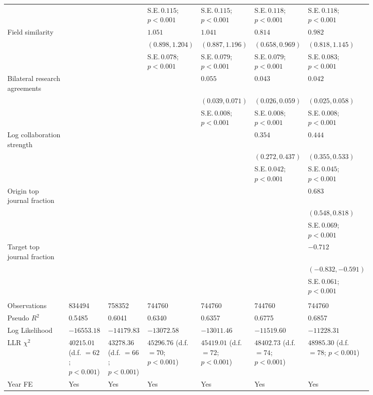 \begin{table}[H]
{\begin{tabular}{p{0.2\linewidth}p{0.11\linewidth}p{0.11\linewidth}p{0.11\linewidth}p{0.11\linewidth}p{0.11\linewidth}p{0.11\linewidth}}
 &  &  & S.E.\,$0.115$; ${p < 0.001}$ & S.E.\,$0.115$; ${p < 0.001}$ & S.E.\,$0.118$; ${p < 0.001}$ & S.E.\,$0.118$; ${p < 0.001}$\\ [0.8ex]  
Field similarity &  &  & $1.051$ & $1.041$ & $0.814$ & $0.982$\\ 
 &  &  & $(0.898, 1.204)$ & $(0.887, 1.196)$ & $(0.658, 0.969)$ & $(0.818, 1.145)$\\ 
 &  &  & S.E.\,$0.078$; ${p < 0.001}$ & S.E.\,$0.079$; ${p < 0.001}$ & S.E.\,$0.079$; ${p < 0.001}$ & S.E.\,$0.083$; ${p < 0.001}$\\ [0.8ex]  
Bilateral research agreements &  &  &  & $0.055$ & $0.043$ & $0.042$\\ 
 &  &  &  & $(0.039, 0.071)$ & $(0.026, 0.059)$ & $(0.025, 0.058)$\\ 
 &  &  &  & S.E.\,$0.008$; ${p < 0.001}$ & S.E.\,$0.008$; ${p < 0.001}$ & S.E.\,$0.008$; ${p < 0.001}$\\ [0.8ex]  
Log collaboration strength &  &  &  &  & $0.354$ & $0.444$\\ 
 &  &  &  &  & $(0.272, 0.437)$ & $(0.355, 0.533)$\\ 
 &  &  &  &  & S.E.\,$0.042$; ${p < 0.001}$ & S.E.\,$0.045$; ${p < 0.001}$\\ [0.8ex]  
Origin top journal fraction &  &  &  &  &  & $0.683$\\ 
 &  &  &  &  &  & $(0.548, 0.818)$\\ 
 &  &  &  &  &  & S.E.\,$0.069$; ${p < 0.001}$\\ [0.8ex]  
Target top journal fraction &  &  &  &  &  & $-0.712$\\ 
 &  &  &  &  &  & $(-0.832, -0.591)$\\ 
 &  &  &  &  &  & S.E.\,$0.061$; ${p < 0.001}$\\ [0.8ex]  
\hline 
\hline \\[-1.8ex] 
Observations & 834494 & 758352 & 744760 & 744760 & 744760 & 744760 \\ 
Pseudo $R^2$ & 0.5485 & 0.6041 & 0.6340 & 0.6357 & 0.6775 & 0.6857 \\ 
Log Likelihood & $-16553.18$ & $-14179.83$ & $-13072.58$ & $-13011.46$ & $-11519.60$ & $-11228.31$ \\ 
LLR $\chi^2$  & $40215.01$ (d.f. $= 62$; ${p < 0.001}$) & $43278.36$ (d.f. $= 66$; ${p < 0.001}$) & $45296.76$ (d.f. $= 70$; ${p < 0.001}$) & $45419.01$ (d.f. $= 72$; ${p < 0.001}$) & $48402.73$ (d.f. $= 74$; ${p < 0.001}$) & $48985.30$ (d.f. $= 78$; ${p < 0.001}$) \\ 
Year FE  & Yes & Yes & Yes & Yes & Yes & Yes \\ 
\hline 
\end{tabular}
}
\end{table}

